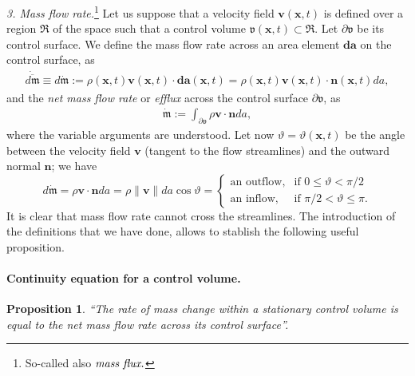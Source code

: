 \documentclass[12pt]{article}
\newtheorem{prop}{Proposition}
\begin{document}
{{\em 3. Mass flow rate.}{\footnote{So-called also $\emph{mass flux.}$}} Let us suppose that a velocity field $\mathbf{v}(\mathbf{x},t)$ is defined over a  region $\Re$ of the space such that a control volume $\mathfrak{v}(\mathbf{x},t)\subset\Re$. Let $\partial\mathfrak{v}$ be its control surface. We define the mass flow rate across an area element $\mathbf{da}$ on the control surface, as
\begin{align*}
\dot{\overline{d\mathfrak{m}}}\equiv{d\dot{\mathfrak{m}}}:=
\rho(\mathbf{x},t)\mathbf{v}(\mathbf{x},t)\!\cdot\!\mathbf{da}(\mathbf{x},t)=
\rho(\mathbf{x},t)\mathbf{v}(\mathbf{x},t)\!\cdot\!\mathbf{n}(\mathbf{x},t)da,
\end{align*}
and the {\em net mass flow rate} or {\em efflux} across the control surface $\partial\mathfrak{v}$, as
\begin{align}
\dot{\mathfrak{m}}:=
\int_{\partial\mathfrak{v}}\rho\mathbf{v}\!\cdot\!\mathbf{n}da,
\end{align}
where the variable arguments are understood. Let now $\vartheta=\vartheta(\mathbf{x},t)$ be the angle between the velocity field $\mathbf{v}$ (tangent to the flow streamlines) and the outward normal $\mathbf{n}$; we have
\[
d\dot{\mathfrak{m}}=\rho\mathbf{v}\!\cdot\!\mathbf{n}da=
\rho\lVert\mathbf{v}\rVert{da}\cos\vartheta= \begin{cases}
\text{an outflow,} & \text{if}\,
\, 0 \leq \vartheta <\pi/2 \\
\text{an inflow,} & \text{if}\,\, \pi/2 < \vartheta \leq \pi.
\end{cases}
\] 
It is clear that mass flow rate cannot cross the streamlines. The introduction of the definitions that we have done, allows to stablish the following useful proposition.
\paragraph{Continuity equation for a control volume.}
\begin{prop} \emph{``The rate of mass change within a stationary control volume is equal to the net mass flow rate across its control surface''}.
\end{prop}

}
\end{document}
